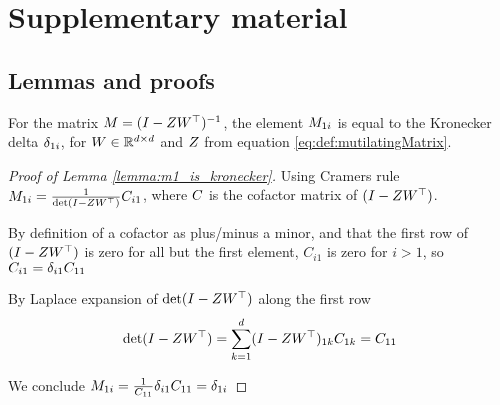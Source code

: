 \section{Supplementary material}
\subsection{Lemmas and proofs}

\begin{lemma} \label{lemma:m1_is_kronecker}
For the matrix $M = (I - Z W^\top)^{-1}$, the element $M_{1i}$ is equal to the Kronecker delta $\delta_{1i}$, for $W\in \mathbb R^{d\times d}$ and $Z$ from equation \eqref{eq:def:mutilatingMatrix}.
\end{lemma}
\begin{proof}[Proof of Lemma \ref{lemma:m1_is_kronecker}]
Using Cramers rule $M_{1i}=\frac{1}{\det(I-ZW^\top)}C_{i1}$, where $C$ is the cofactor matrix of $(I-ZW^\top)$.

By definition of a cofactor as plus/minus a minor, and that the first row of $(I-ZW^\top)$ is zero for all but the first element, $C_{i1}$ is zero for $i>1$, so $C_{i1} = \delta_{i1}C_{11}$

By Laplace expansion of $\det(I-ZW^\top)$ along the first row
\[ \det(I-ZW^\top) = \sum_{k=1}^d (I-ZW^\top)_{1k} C_{1k} = C_{11} \]

We conclude $M_{1i} = \frac{1}{C_{11}}\delta_{i1}C_{11} = \delta_{1i}$
\end{proof}

